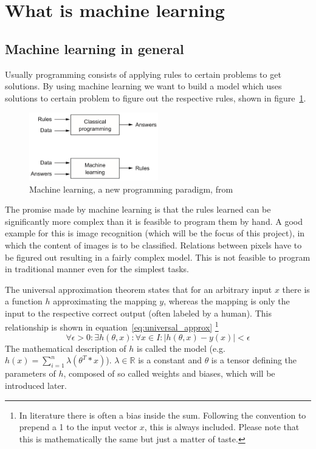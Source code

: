 \section{What is machine learning} \label{ch:what_is_ml}

\subsection{Machine learning in general}

Usually programming consists of applying rules to certain problems to get solutions.
By using machine learning we want to build a model which uses solutions to certain problem to figure out the respective rules, shown in figure~\ref{fig:cp_vs_ml}.

\begin{figure}
    \centering
    \includegraphics[width=0.5\textwidth]{images/classical_prog_vs_ml.png}
    \caption{Machine learning, a new programming paradigm, from
        \cite[p.5]{Chollet2017}}
    \label{fig:cp_vs_ml}
\end{figure}

The promise made by machine learning is that the rules learned can be significantly more complex than it is feasible to program them by hand.
A good example for this is image recognition (which will be the focus of this project), in which the content of images is to be classified.
Relations between pixels have to be figured out resulting in a fairly complex model.
This is not feasible to program in traditional manner even for the simplest tasks.

The universal approximation theorem \cite{Cybenko1989} \cite{Hornik1989} states that for an arbitrary input $x$ there is a function $h$ approximating the mapping $y$, whereas the mapping is only the input to the respective correct output (often labeled by a human).
This relationship is shown in equation~\eqref{eq:universal_approx} \footnote{In literature there is often a bias inside the sum.
Following the convention to prepend a 1 to the input vector $x$, this is always included.
Please note that this is mathematically the same but just a matter of taste.}
\begin{equation}
    \forall \epsilon > 0 :
    \exists h(\theta, x) : \forall x \in I : | h(\theta, x) - y(x) | < \epsilon
    \label{eq:universal_approx}
\end{equation}
The mathematical description of $h$ is called the model (e.g.  $h(x) = \sum_{i=1}^n{\lambda (\theta^T * x)}$).
$\lambda \in \mathbb{R}$ is a constant and $\theta$ is a tensor defining the parameters of $h$, composed of so called weights and biases, which will be introduced later.

